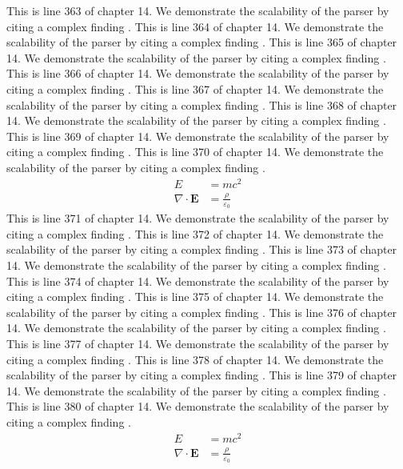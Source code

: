 This is line 363 of chapter 14. We demonstrate the scalability of the parser by citing a complex finding \cite{ref14_363}.
This is line 364 of chapter 14. We demonstrate the scalability of the parser by citing a complex finding \cite{ref14_364}.
This is line 365 of chapter 14. We demonstrate the scalability of the parser by citing a complex finding \cite{ref14_365}.
This is line 366 of chapter 14. We demonstrate the scalability of the parser by citing a complex finding \cite{ref14_366}.
This is line 367 of chapter 14. We demonstrate the scalability of the parser by citing a complex finding \cite{ref14_367}.
This is line 368 of chapter 14. We demonstrate the scalability of the parser by citing a complex finding \cite{ref14_368}.
This is line 369 of chapter 14. We demonstrate the scalability of the parser by citing a complex finding \cite{ref14_369}.
This is line 370 of chapter 14. We demonstrate the scalability of the parser by citing a complex finding \cite{ref14_370}.
\begin{align*}
  E &= mc^2 \\
  \nabla \cdot \mathbf{E} &= \frac{\rho}{\varepsilon_0}
\end{align*}
This is line 371 of chapter 14. We demonstrate the scalability of the parser by citing a complex finding \cite{ref14_371}.
This is line 372 of chapter 14. We demonstrate the scalability of the parser by citing a complex finding \cite{ref14_372}.
This is line 373 of chapter 14. We demonstrate the scalability of the parser by citing a complex finding \cite{ref14_373}.
This is line 374 of chapter 14. We demonstrate the scalability of the parser by citing a complex finding \cite{ref14_374}.
This is line 375 of chapter 14. We demonstrate the scalability of the parser by citing a complex finding \cite{ref14_375}.
This is line 376 of chapter 14. We demonstrate the scalability of the parser by citing a complex finding \cite{ref14_376}.
This is line 377 of chapter 14. We demonstrate the scalability of the parser by citing a complex finding \cite{ref14_377}.
This is line 378 of chapter 14. We demonstrate the scalability of the parser by citing a complex finding \cite{ref14_378}.
This is line 379 of chapter 14. We demonstrate the scalability of the parser by citing a complex finding \cite{ref14_379}.
This is line 380 of chapter 14. We demonstrate the scalability of the parser by citing a complex finding \cite{ref14_380}.
\begin{align*}
  E &= mc^2 \\
  \nabla \cdot \mathbf{E} &= \frac{\rho}{\varepsilon_0}
\end{align*}
